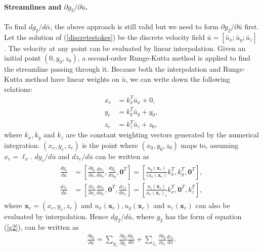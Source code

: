 \paragraph{Streamlines and $\partial g_2/\partial {\bar{u}}$.}
To find $d g_2/d \bar{\alpha}$, the above approach is still valid but
we need to form $\partial{g_2}/\partial{\bar{u}}$ first. Let the
solution of (\ref{discretestokes}) be the discrete velocity field
$\bar{u} = [\bar{u}_{x}; \bar{u}_{y}; \bar{u}_{z}]$. The velocity at
any point can be evaluated by linear interpolation. Given an initial
point $(0,y_{0},z_{0})$, a second-order Runge-Kutta method is applied to
find the streamline passing through it. Because both the interpolation
and Runge-Kutta method have linear weights on $\bar{u}$, we can write
down the following relations:
\begin{align*}
 x_e & =  k_{x}^T \bar{u}_{x}+0,\\
 y_e & =  k_{y}^T \bar{u}_{y}+y_{0},\\
 z_e & =  k_{z}^T \bar{u}_{z}+z_{0},
\end{align*}
where $k_{x},k_{y}$ and $k_{z}$ are the constant weighting vectors
generated by the numerical integration. $(x_e,y_e,z_e)$ is the point
where $(x_{0},y_{0},z_{0})$ maps to, assuming $x_e= \ell_x$.
$dy_e/d\bar{u}$ and $dz_e/d\bar{u}$ can be written as
\begin{align}
\begin{split}
 \frac{dy_e}{d\bar{u}} & =  \left[  \frac{\partial{y_e}}{\partial{x_e}} \frac{dx_e}{d\bar{u}_{x}},
                                        \frac{dy_e}{d\bar{u}_{y}},
                                        \mathbf{0}^T\right]
                                  =  \left[\frac{u_y(\mathbf{x}_e)}{(u_x(\mathbf{x}_e)}k_{x}^T,
                                        k_{y}^T ,\mathbf{0}^T    \right], \\
 \frac{dz_e}{d\bar{u}} & =  \left[  \frac{\partial{z_e}}{\partial{x_e}} \frac{dx_e}{d\bar{u}_{x}},
                                        \mathbf{0}^T,
                                        \frac{dz_{f}}{d\bar{u}_{z}}\right]
                                  = \left[\frac{u_z(\mathbf{x}_e)}{u_x(\mathbf{x}_e)_e}k_{x}^T,
                                        \mathbf{0}^T, k_{z}^T  \right],
\end{split}
\end{align}
where $\mathbf{x}_e= (x_e,y_e,z_e)$ and $u_x(\mathbf{x}_e),u_y(\mathbf{x}_e)$ and $u_z(\mathbf{x}_e)$ can also be evaluated by interpolation. Hence
$dg_2/d\bar{u}$, where $g_2$ has the form of equation (\ref{g2}), can
be written as
\begin{eqnarray}
   \frac{\partial g_2}{\partial \bar{u}} = \sum_{y_e} \frac{\partial{g_2}}{\partial{y_e}} \frac{dy_e}{d\bar{u}}+
                                    \sum_{z_e} \frac{\partial{g_2}}{\partial{z_e}}\frac{dz_e}{d\bar{u}}.
\end{eqnarray}
